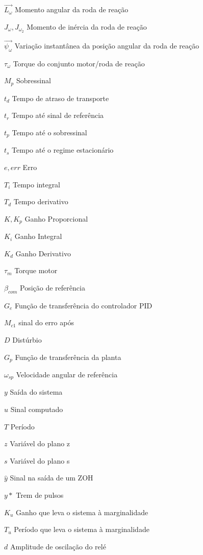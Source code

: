 \begin{simbolos}
  \item[$\vec{L_{\omega}}$] Momento angular da roda de reação
  \item[$J_{\omega}, J_{\omega_2}$] Momento de inércia da roda de reação
  \item[$\vec{\psi_{\omega}}$] Variação instantânea da posição angular da roda de reação
  \item[$\tau_{\omega}$] Torque do conjunto motor/roda de reação
  \item[$M_p$] Sobressinal
  \item[$t_d$] Tempo de atraso de transporte
  \item[$t_r$] Tempo até sinal de referência
  \item[$t_p$] Tempo até o sobressinal
  \item[$t_s$] Tempo até o regime estacionário
  \item[$e,err$] Erro
  \item[$T_i$] Tempo integral
  \item[$T_d$] Tempo derivativo
  \item[$K, K_p$] Ganho Proporcional
  \item[$K_i$] Ganho Integral
  \item[$K_d$] Ganho Derivativo
  \item[$\tau_m$] Torque motor
  \item[$\beta_{com}$] Posição de referência
  \item[$G_e$] Função de transferência do controlador PID
  \item[$M_{c1}$] sinal do erro após
  \item[$D$] Distúrbio
  \item[$G_p$] Função de transferência da planta
  \item[$\omega_{sp}$] Velocidade angular de referência
  \item[$y$] Saída do sistema
  \item[$u$] Sinal computado
  \item[$T$] Período
  \item[$z$] Variável do plano z
  \item[$s$] Variável do plano s
  \item[$\hat{y}$] Sinal na saída de um ZOH
  \item[$y*$] Trem de pulsos
  \item[$K_u$] Ganho que leva o sistema à marginalidade
  \item[$T_u$] Período que leva o sistema à marginalidade
  \item[$d$] Amplitude de oscilação do relé

\end{simbolos}
